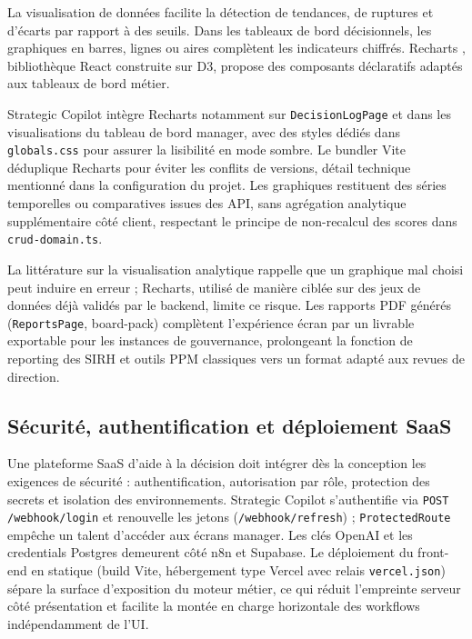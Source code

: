 La visualisation de données facilite la détection de tendances, de ruptures et d'écarts par rapport à des seuils. Dans les tableaux de bord décisionnels, les graphiques en barres, lignes ou aires complètent les indicateurs chiffrés. Recharts \cite{recharts2025,tufte2001}, bibliothèque React construite sur D3, propose des composants déclaratifs adaptés aux tableaux de bord métier.

Strategic Copilot intègre Recharts notamment sur \texttt{DecisionLogPage} et dans les visualisations du tableau de bord manager, avec des styles dédiés dans \texttt{globals.css} pour assurer la lisibilité en mode sombre. Le bundler Vite déduplique Recharts pour éviter les conflits de versions, détail technique mentionné dans la configuration du projet. Les graphiques restituent des séries temporelles ou comparatives issues des API, sans agrégation analytique supplémentaire côté client, respectant le principe de non-recalcul des scores dans \texttt{crud-domain.ts}.

La littérature sur la visualisation analytique rappelle que un graphique mal choisi peut induire en erreur ; Recharts, utilisé de manière ciblée sur des jeux de données déjà validés par le backend, limite ce risque. Les rapports PDF générés (\texttt{ReportsPage}, board-pack) complètent l'expérience écran par un livrable exportable pour les instances de gouvernance, prolongeant la fonction de reporting des SIRH et outils PPM classiques vers un format adapté aux revues de direction.

\subsection{Sécurité, authentification et déploiement SaaS}

Une plateforme SaaS d'aide à la décision doit intégrer dès la conception les exigences de sécurité : authentification, autorisation par rôle, protection des secrets et isolation des environnements. Strategic Copilot s'authentifie via \texttt{POST /webhook/login} et renouvelle les jetons (\texttt{/webhook/refresh}) ; \texttt{ProtectedRoute} empêche un talent d'accéder aux écrans manager. Les clés OpenAI et les credentials Postgres demeurent côté n8n et Supabase. Le déploiement du front-end en statique (build Vite, hébergement type Vercel avec relais \texttt{vercel.json}) sépare la surface d'exposition du moteur métier, ce qui réduit l'empreinte serveur côté présentation et facilite la montée en charge horizontale des workflows indépendamment de l'UI.

